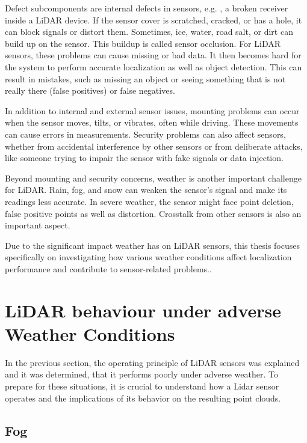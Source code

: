 \cite{goelles_fault_2020} 

Defect subcomponents are internal defects in sensors, e.g. , a broken receiver inside a LiDAR device. If the sensor cover is scratched, cracked, or has a hole, it can block signals or distort them. Sometimes, ice, water, road salt, or dirt can build up on the sensor. This buildup is called sensor occlusion. For LiDAR sensors, these problems can cause missing or bad data. It then becomes hard for the system to perform accurate localization as well as object detection. This can result in mistakes, such as missing an object or seeing something that is not really there (false positives) or false negatives. \cite{goelles_fault_2020}

In addition to internal and external sensor issues, mounting problems can occur when the sensor moves, tilts, or vibrates, often while driving. These movements can cause errors in measurements. Security problems can also affect sensors, whether from accidental interference by other sensors or from deliberate attacks, like someone trying to impair the sensor with fake signals or data injection.

Beyond mounting and security concerns, weather is another important challenge for LiDAR. Rain, fog, and snow can weaken the sensor's signal and make its readings less accurate. In severe weather, the sensor might face point deletion, false positive points as well as distortion. Crosstalk from other sensors is also an important aspect. 

Due to the significant impact weather has on LiDAR sensors, this thesis focuses specifically on investigating how various weather conditions affect localization performance and contribute to sensor-related problems.\cite{dreissig_survey_2023}.




\section{LiDAR behaviour under adverse Weather Conditions}
In the previous section, the operating principle of LiDAR sensors was explained and it was determined, that it performs poorly under adverse weather. To prepare for these situations, it is crucial to understand how a Lidar sensor operates and the implications of its behavior on the resulting point clouds. 

\subsection{Fog}

